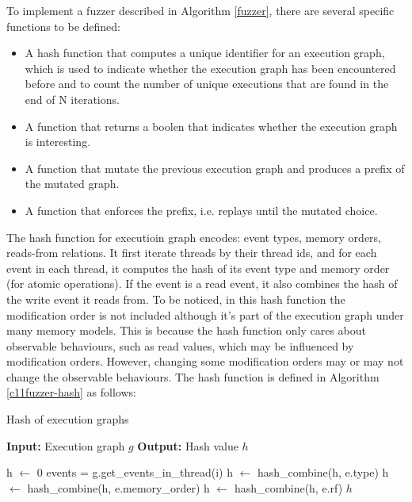 To implement a fuzzer described in Algorithm \ref{fuzzer}, there are several specific functions to be defined:

\begin{itemize}
    \item A hash function that computes a unique identifier for an execution graph, which is used to indicate whether the execution graph has been encountered before and to count the number of unique executions that are found in the end of N iterations. 
    \item A function that returns a boolen that indicates whether the execution graph is interesting.
    \item A function that mutate the previous execution graph and produces a prefix of the mutated graph. 
    \item A function that enforces the prefix, i.e. replays until the mutated choice. 
\end{itemize}

The hash function for executioin graph encodes: event types, memory orders, reads-from relations. It first iterate threads by their thread ids, and for each event in each thread, it computes the hash of its event type and memory order (for atomic operations). If the event is a read event, it also combines the hash of the write event it reads from. To be noticed, in this hash function the modification order is not included although it's part of the execution graph under many memory models. This is because the hash function only cares about observable behaviours, such as read values, which may be influenced by modification orders. However, changing some modification orders may or may not change the observable behaviours. The hash function is defined in Algorithm \ref{c11fuzzer-hash} as follows:


\begin{algorithm}
    \caption{Hash of execution graphs}
    \label{c11fuzzer-hash}
    \begin{algorithmic}
        \STATE \textbf{Input:} Execution graph $g$
        \STATE \textbf{Output:} Hash value $h$

        \STATE h $\leftarrow$ 0
            \STATE events = g.get\_events\_in\_thread(i)
                \STATE h $\leftarrow$ hash\_combine(h, e.type)
                \STATE h $\leftarrow$ hash\_combine(h, e.memory\_order)
                    \STATE h $\leftarrow$ hash\_combine(h, e.rf)
                \ENDIF
            \ENDFOR
        \ENDFOR
    \RETURN $h$
    \end{algorithmic}
\end{algorithm}

